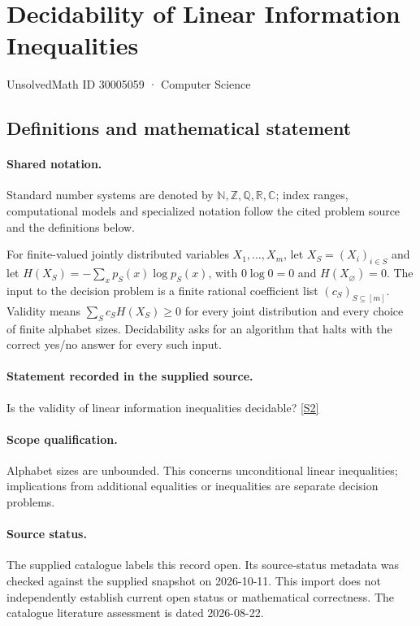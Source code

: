 \documentclass[11pt]{article}
\newcommand{\sref}[2]{\hyperlink{source:#1:#2}{[S#2]}}
\begin{document}
\setcounter{section}{30005058}
\section{Decidability of Linear Information Inequalities}\label{30005059}
{\small\sffamily UnsolvedMath ID 30005059 · Computer Science}
\subsection{Definitions and mathematical statement}

\paragraph{Shared notation.}Standard number systems are denoted by $\mathbb N,\mathbb Z,\mathbb Q,\mathbb R,\mathbb C$; index ranges, computational models and specialized notation follow the cited problem source and the definitions below.


For finite-valued jointly distributed variables $X_1,\ldots,X_m$, let $X_S=(X_i)_{i\in S}$ and let $H(X_S)=-\sum_x p_S(x)\log p_S(x)$, with $0\log0=0$ and $H(X_\varnothing)=0$. The input to the decision problem is a finite rational coefficient list $(c_S)_{S\subseteq[m]}$. Validity means $\sum_S c_SH(X_S)\geq0$ for every joint distribution and every choice of finite alphabet sizes. Decidability asks for an algorithm that halts with the correct yes/no answer for every such input.
\paragraph{Statement recorded in the supplied source.}
Is the validity of linear information inequalities decidable? \sref{30005059}{2}
\paragraph{Scope qualification.}
Alphabet sizes are unbounded. This concerns unconditional linear inequalities; implications from additional equalities or inequalities are separate decision problems.
\paragraph{Source status.}
The supplied catalogue labels this record open. Its source-status metadata was checked against the supplied snapshot on 2026-10-11. This import does not independently establish current open status or mathematical correctness. The catalogue literature assessment is dated 2026-08-22.
\end{document}
